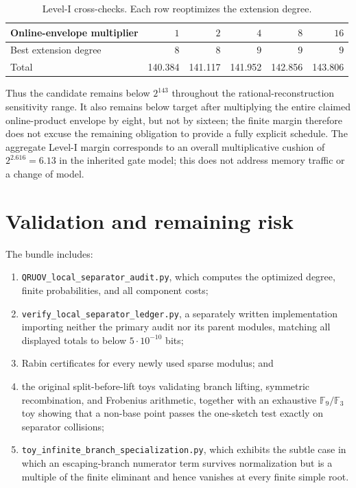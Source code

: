 \documentclass[11pt]{article}
\theoremstyle{definition}
\newcommand{\F}{\mathbb F}
\begin{document}
\begin{table}[ht]
\centering
\caption{Level-I cross-checks.  Each row reoptimizes the extension degree.}
\label{tab:robustness}
\begin{tabular}{@{}lrrrrr@{}}
\toprule
Online-envelope multiplier & $1$ & $2$ & $4$ & $8$ & $16$\\
\midrule
Best extension degree & $8$ & $8$ & $9$ & $9$ & $9$\\
Total & 140.384 & 141.117 & 141.952 & 142.856 & 143.806\\
\bottomrule
\end{tabular}
\end{table}

Thus the candidate remains below $2^{143}$ throughout the rational-reconstruction sensitivity range.  It also remains below target after multiplying the entire claimed online-product envelope by eight, but not by sixteen; the finite margin therefore does not excuse the remaining obligation to provide a fully explicit schedule.  The aggregate Level-I margin corresponds to an overall multiplicative cushion of $2^{2.616}=6.13$ in the inherited gate model; this does not address memory traffic or a change of model.

\section{Validation and remaining risk}

The bundle includes:
\begin{enumerate}
\item \texttt{QRUOV\_local\_separator\_audit.py}, which computes the optimized degree, finite probabilities, and all component costs;
\item \texttt{verify\_local\_separator\_ledger.py}, a separately written implementation importing neither the primary audit nor its parent modules, matching all displayed totals to below $5\cdot10^{-10}$ bits;
\item Rabin certificates for every newly used sparse modulus; and
\item the original split-before-lift toys validating branch lifting, symmetric recombination, and Frobenius arithmetic, together with an exhaustive $\F_9/\F_3$ toy showing that a non-base point passes the one-sketch test exactly on separator collisions;
\item \texttt{toy\_infinite\_branch\_specialization.py}, which exhibits the subtle case in which an escaping-branch numerator term survives normalization but is a multiple of the finite eliminant and hence vanishes at every finite simple root.
\end{enumerate}
\end{document}
